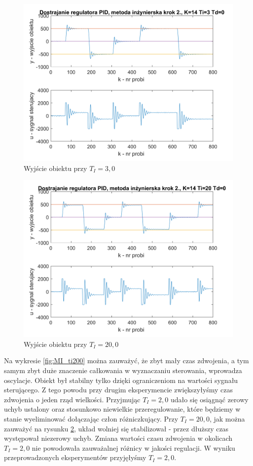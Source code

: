 \documentclass[a4paper, 10pt]{article}
\begin{document}
\begin{figure}[H]
	\centering
	\includegraphics[width=0.9\linewidth]{MI_ti3000}
	\caption{Wyjście obiektu przy $T_{I}=3,0$ }
	\label{fig:MI_ti3000}
\end{figure}
\begin{figure}[H]
	\centering
	\includegraphics[width=0.9\linewidth]{MI_ti20000}
	\caption{Wyjście obiektu przy $T_{I}=20,0$ }
	\label{fig:MI_ti20000}
\end{figure}

Na wykresie \ref{fig:MI_ti200} można zauważyć, że zbyt mały czas zdwojenia, a tym samym zbyt duże znaczenie całkowania w wyznaczaniu sterowania, wprowadza oscylacje. Obiekt był stabilny tylko dzięki ograniczeniom na wartości sygnału sterującego. Z tego powodu przy drugim eksperymencie zwiększyłyśmy czas zdwojenia o jeden rząd wielkości. Przyjmując $T_{I}=2,0$ udało się osiągnąć zerowy uchyb ustalony oraz stosunkowo niewielkie przeregulowanie, które będziemy w stanie wyeliminować dołączając człon różniczkujący. Przy $T_{I}=20,0$, jak można zauważyć na rysunku \ref{fig:MI_ti20000}, układ wolniej się stabilizował - przez dłuższy czas występował niezerowy uchyb. Zmiana wartości czasu zdwojenia w okolicach $T_{I}=2,0$ nie powodowała zauważalnej różnicy w jakości regulacji. W wyniku przeprowadzonych eksperymentów przyjęłyśmy $T_{I}=2,0$.
\end{document}
